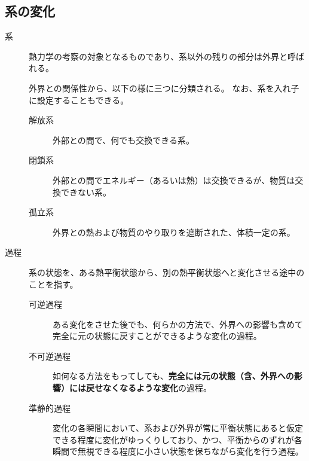 \documentclass[uplatex,dvipdfmx,a4paper,11pt]{jsarticle}
\begin{document}
\subsection{系の変化}
\begin{description}
\item[系]
熱力学の考察の対象となるものであり、系以外の残りの部分は外界と呼ばれる。

外界との関係性から、以下の様に三つに分類される。
なお、系を入れ子に設定することもできる。

\begin{description}
\item[解放系]
外部との間で、何でも交換できる系。
\item[閉鎖系]
外部との間でエネルギー（あるいは熱）は交換できるが、物質は交換できない系。
\item[孤立系]
外界との熱および物質のやり取りを遮断された、体積一定の系。
\end{description}

\item[過程]
系の状態を、ある熱平衡状態から、別の熱平衡状態へと変化させる途中のことを指す。

\begin{description}
\item[可逆過程]
ある変化をさせた後でも、何らかの方法で、外界への影響も含めて完全に元の状態に戻すことができるような変化の過程。

\item[不可逆過程]
如何なる方法をもってしても、{\bf 完全には元の状態（含、外界への影響）には戻せなくなるような変化}の過程。

\item[準静的過程]
変化の各瞬間において、系および外界が常に平衡状態にあると仮定できる程度に変化がゆっくりしており、かつ、平衡からのずれが各瞬間で無視できる程度に小さい状態を保ちながら変化を行う過程。
\end{description}

\end{description}
\end{document}
